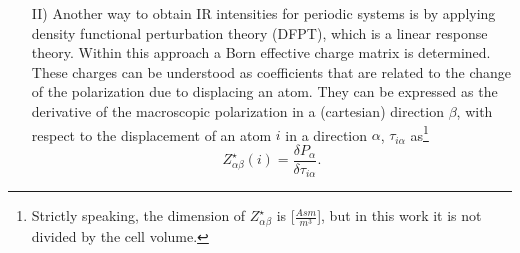 \documentclass[11pt,DIV=13,BCOR=5mm,a4paper,headinclude]{scrbook}
\renewcommand{\vec}[1]{\underline{#1}}
\begin{document}
\begin{itemize}




\item[II)] Another way to obtain IR intensities for periodic systems is by applying density functional perturbation theory (DFPT)\cite{Baroni1987,Giannozzi1991}, which is a linear response theory.
Within this approach a Born effective charge matrix is determined\cite{Born1954}.
These charges can be understood as coefficients that are related to the change of the polarization due to displacing an atom.
They can be expressed as the derivative of the macroscopic polarization in a (cartesian) direction $\beta$, with respect to the displacement of an atom $i$ in a direction $\alpha$, $\tau_{i\alpha}$ as\footnote{Strictly speaking, the dimension of $Z^\star_{\alpha\beta}$ is [$\frac{Asm}{m^3}$], but in this work it is not divided by the cell volume.}
\begin{equation}
Z^\star_{\alpha\beta}(i)=\frac{\delta P_\alpha}{\delta \tau_{i\alpha}}.
\end{equation}


\end{itemize}
\end{document}
